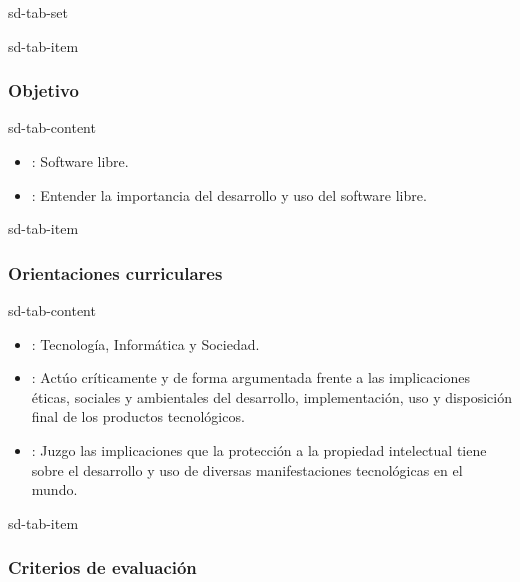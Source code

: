 \documentclass[letterpaper,10pt,spanish]{sphinxmanual}
\begin{document}
\begin{sphinxuseclass}{sd-tab-set}
\begin{sphinxuseclass}{sd-tab-item}\subsubsection*{Objetivo}

\begin{sphinxuseclass}{sd-tab-content}\begin{itemize}
\item {} 
\sphinxAtStartPar
{}: Software libre.

\item {} 
\sphinxAtStartPar
{}: Entender la importancia del desarrollo y uso del software libre.

\end{itemize}

\end{sphinxuseclass}
\end{sphinxuseclass}
\begin{sphinxuseclass}{sd-tab-item}\subsubsection*{Orientaciones curriculares}

\begin{sphinxuseclass}{sd-tab-content}\begin{itemize}
\item {} 
\sphinxAtStartPar
{}: Tecnología, Informática y Sociedad.

\item {} 
\sphinxAtStartPar
{}: Actúo críticamente y de forma argumentada frente a las implicaciones éticas, sociales y ambientales del desarrollo, implementación, uso y disposición final de los productos tecnológicos.

\item {} 
\sphinxAtStartPar
{}: Juzgo las implicaciones que la protección a la propiedad intelectual tiene sobre el desarrollo y uso de diversas manifestaciones tecnológicas en el mundo.

\end{itemize}

\end{sphinxuseclass}
\end{sphinxuseclass}
\begin{sphinxuseclass}{sd-tab-item}\subsubsection*{Criterios de evaluación}


\end{sphinxuseclass}
\end{sphinxuseclass}
\end{document}
